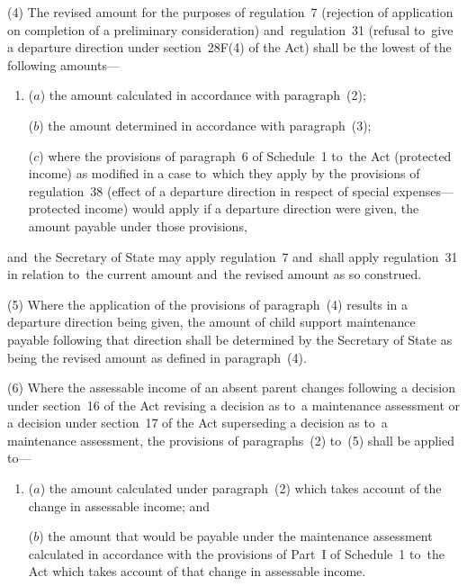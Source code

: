 \documentclass[12pt,a4paper]{article}
\begin{document}
(4) The revised amount for the purposes of regulation~7 (rejection of application on completion of a preliminary consideration) and~regulation~31 (refusal to~give a departure direction under section~28F(4) of the Act) shall be the lowest of the following amounts—
\begin{enumerate}\item[]
($a$) the amount calculated in accordance with paragraph~(2);

($b$) the amount determined in accordance with paragraph~(3);

($c$) where the provisions of paragraph~6 of Schedule~1 to~the Act (protected income) as modified in a case to~which they apply by the provisions of regulation~38 (effect of a departure direction in respect of special expenses—protected income) would apply if a departure direction were given, the amount payable under those provisions,
\end{enumerate}
and~the Secretary of State may apply regulation~7 and~shall apply regulation~31 in relation to~the current amount and~the revised amount as so construed.

(5) 
Where the application of the provisions of paragraph~(4) results in a departure direction being given, the amount of child support maintenance payable following that direction shall be determined by 
the Secretary of State  %
as being the revised amount as defined in paragraph~(4).

(6) Where the assessable income of an absent parent changes following 
a decision under section~16 of the Act revising a decision as to~a maintenance assessment or a decision under section~17 of the Act superseding a decision as to~a maintenance assessment,  %
the provisions of paragraphs~(2) to~(5) shall be applied to—
\begin{enumerate}\item[]
($a$) the amount calculated under paragraph~(2) which takes account of the change
in assessable income; and

($b$) the amount that would be payable under the maintenance assessment calculated
in accordance with the provisions of Part~I of Schedule~1 to~the Act which takes
account of that change in assessable income.
\end{enumerate}
\end{document}
